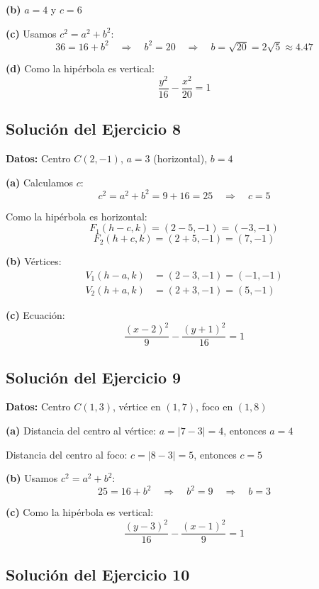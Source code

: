 \documentclass[12pt,a4paper]{article}
\begin{document}
	\textbf{(b)} $\boxed{a=4}$ y $\boxed{c=6}$

	\textbf{(c)} Usamos $c^2=a^2+b^2$:
	\[
	36=16+b^2 \quad\Rightarrow\quad b^2=20 \quad\Rightarrow\quad \boxed{b=\sqrt{20}=2\sqrt{5}\approx 4.47}
	\]

	\textbf{(d)} Como la hipérbola es vertical:
	\[
	\boxed{\frac{y^2}{16}-\frac{x^2}{20}=1}
	\]

	\subsection*{Solución del Ejercicio 8}

	\textbf{Datos:} Centro $C(2,-1)$, $a=3$ (horizontal), $b=4$

	\bigskip

	\textbf{(a)} Calculamos $c$:
	\[
	c^2=a^2+b^2=9+16=25 \quad\Rightarrow\quad c=5
	\]

	Como la hipérbola es horizontal:
	\[
	F_1(h-c,k)=(2-5,-1)=(-3,-1)
	\]
	\[
	F_2(h+c,k)=(2+5,-1)=(7,-1)
	\]


	\textbf{(b)} Vértices:
	\[
	\begin{aligned}
		V_1(h-a,k)&=(2-3,-1)=(-1,-1)\\
		V_2(h+a,k)&=(2+3,-1)=(5,-1)
	\end{aligned}
	\]


	\textbf{(c)} Ecuación:
	\[
	\boxed{\frac{(x-2)^2}{9}-\frac{(y+1)^2}{16}=1}
	\]

	\subsection*{Solución del Ejercicio 9}

	\textbf{Datos:} Centro $C(1,3)$, vértice en $(1,7)$, foco en $(1,8)$

	\bigskip

	\textbf{(a)} Distancia del centro al vértice: $a=|7-3|=4$, entonces $\boxed{a=4}$

	Distancia del centro al foco: $c=|8-3|=5$, entonces $\boxed{c=5}$

	\textbf{(b)} Usamos $c^2=a^2+b^2$:
	\[
	25=16+b^2 \quad\Rightarrow\quad b^2=9 \quad\Rightarrow\quad \boxed{b=3}
	\]

	\textbf{(c)} Como la hipérbola es vertical:
	\[
	\boxed{\frac{(y-3)^2}{16}-\frac{(x-1)^2}{9}=1}
	\]

	\subsection*{Solución del Ejercicio 10}
\end{document}

